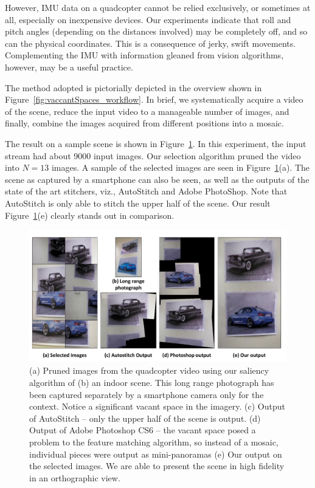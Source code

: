 However, IMU data on a quadcopter cannot be relied exclusively, or sometimes at
all, especially on inexpensive devices. Our experiments indicate that roll
and pitch angles (depending on the distances involved) may be completely off,
and so can the physical coordinates.  This is a consequence of jerky,
swift movements.  Complementing the IMU with information gleaned from
vision algorithms, however, may be a useful practice.

The method adopted is pictorially depicted in the overview shown in
Figure~\ref{fig:vaccantSpaces_workflow}.  In brief, we systematically acquire a 
video of the scene, reduce the input video to a manageable number of images, and finally, 
combine the images acquired from different positions into a mosaic. 

The result on a sample scene is shown in Figure~\ref{fig:vacantSpaces_result}.
In this experiment, the input stream had about 9000 input images.  Our selection algorithm
 pruned the video into $N=13$ images. A sample of the selected images are seen
 in Figure~\ref{fig:vacantSpaces_result}(a).  The scene as captured by a
 smartphone can also be seen, as well as the outputs of the state of the art
 stitchers, viz., AutoStitch\cite{autostitch} and Adobe
 PhotoShop\cite{photoshop}. Note that AutoStitch\cite{autostitch} is only able
 to stitch the upper half of the scene.  Our result
 Figure~\ref{fig:vacantSpaces_result}(e) clearly stands out in comparison.\\
  
  \begin{figure}[h!]
	\centering
	\includegraphics[width=0.98\linewidth]{figures/vacantSpaces/indoor_results}
	\caption[Result: Cars]{ (a) Pruned images from the quadcopter video using our
  saliency algorithm of (b) an indoor scene. This long range photograph
  has been captured separately by a smartphone camera only for the
  context. Notice a significant vacant space in the imagery.  (c)
  Output of AutoStitch -- only the upper half of the scene is output.
  (d) Output of Adobe Photoshop CS6 -- the vacant space posed a problem to the
  feature matching algorithm, so instead of a mosaic, individual
  pieces were output as mini-panoramas (e) Our output on the selected
  images. We are able to present the scene in high fidelity in an
  orthographic view.}	
	\label{fig:vacantSpaces_result}
	\end{figure}
  
